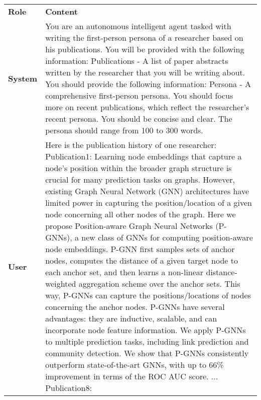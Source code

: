 \begin{table*}[ht]
\centering
\footnotesize
\renewcommand{\arraystretch}{1.3}
\begin{tabular}{p{1cm}p{11.5cm}}
\toprule[1.5pt] 
\textbf{Role} & \textbf{Content} \\ 
\cmidrule[0.5pt](lr){1-2}
\textbf{System} &     You are an autonomous intelligent agent tasked with writing the first-person persona of a researcher based on his publications.\newline
You will be provided with the following information:\newline
Publications - A list of paper abstracts written by the researcher that you will be writing about.\newline
You should provide the following information:\newline 
Persona - A comprehensive first-person persona. \newline
You should focus more on recent publications, which reflect the researcher's recent persona. You should be concise and clear. The persona should range from 100 to 300 words.\\ 
\midrule
\textbf{User} &   Here is the publication history of one researcher:\newline
  Publication1:\newline
  Learning node embeddings that capture a node's position within the broader graph structure is crucial for many prediction tasks on graphs. However, existing Graph Neural Network (GNN) architectures have limited power in capturing the position/location of a given node concerning all other nodes of the graph. Here we propose Position-aware Graph Neural Networks (P-GNNs), a new class of GNNs for computing position-aware node embeddings. P-GNN first samples sets of anchor nodes, computes the distance of a given target node to each anchor set, and then learns a non-linear distance-weighted aggregation scheme over the anchor sets. This way, P-GNNs can capture the positions/locations of nodes concerning the anchor nodes. P-GNNs have several advantages: they are inductive, scalable, and can incorporate node feature information. We apply P-GNNs to multiple prediction tasks, including link prediction and community detection. We show that P-GNNs consistently outperform state-of-the-art GNNs, with up to 66\% improvement in terms of the ROC AUC score.\newline
  ...\newline
  Publication8:\newline

\end{tabular}
\end{table*}
